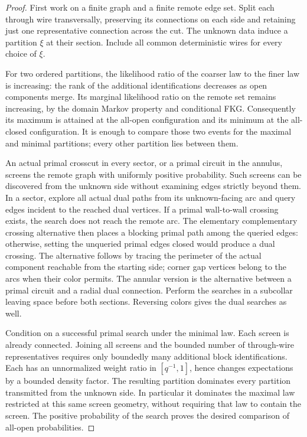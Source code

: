 \begin{proof}
First work on a finite graph and a finite remote edge set. Split each
through wire transversally, preserving its connections on each side and
retaining just one representative connection across the cut. The unknown
data induce a partition $\xi$ at their section. Include all common
deterministic wires for every choice of $\xi$.

For two ordered partitions, the likelihood ratio of the coarser law to
the finer law is increasing: the rank of the additional identifications
decreases as open components merge. Its marginal likelihood ratio on
the remote set remains increasing, by the domain Markov property and
conditional FKG. Consequently its maximum is attained at the all-open
configuration and its minimum at the all-closed configuration. It is
enough to compare those two events for the maximal and minimal partitions;
every other partition lies between them.

An actual primal crosscut in every sector, or a primal circuit in the
annulus, screens the remote graph with uniformly positive probability.
Such screens can be discovered from the unknown side without examining
edges strictly beyond them. In a sector, explore all actual dual paths
from its unknown-facing arc and query edges incident to the reached dual
vertices. If a primal wall-to-wall crossing exists, the search does not
reach the remote arc. The elementary complementary crossing alternative
then places a blocking primal path among the queried edges: otherwise,
setting the unqueried primal edges closed would produce a dual crossing.
The alternative follows by tracing the perimeter of the actual component
reachable from the starting side; corner gap vertices belong to the arcs
when their color permits. The annular version is the alternative between
a primal circuit and a radial dual connection. Perform the searches in a
subcollar leaving space before both sections. Reversing colors gives the
dual searches as well.

Condition on a successful primal search under the minimal law. Each
screen is already connected. Joining all screens and the bounded number
of through-wire representatives requires only boundedly many additional
block identifications. Each has an unnormalized weight ratio in
$[q^{-1},1]$, hence changes expectations by a bounded density factor.
The resulting partition dominates every partition transmitted from the
unknown side. In particular it dominates the maximal law restricted at
this same screen geometry, without requiring that law to contain the
screen. The positive probability of the search proves the desired
comparison of all-open probabilities.


\end{proof}

